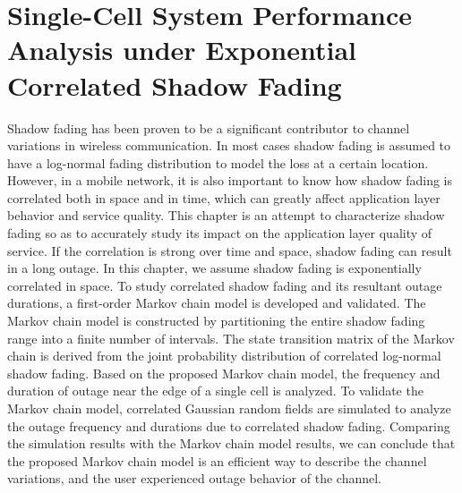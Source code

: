 \chapter{Single-Cell System Performance Analysis under Exponential Correlated Shadow Fading}\label{ch:3}
\par Shadow fading has been proven to be a significant contributor to channel variations in wireless communication. In most cases shadow fading is assumed to have a log-normal fading distribution to model the loss at a certain location. However, in a mobile network, it is also important to know how shadow fading is correlated both in space and in time, which can greatly affect application layer behavior and service quality. This chapter is an attempt to characterize shadow fading so as to accurately study its impact on the application layer quality of service. If the correlation is strong over time and space, shadow fading can result in a long outage. In this chapter, we assume shadow fading is exponentially correlated in space. To study correlated shadow fading and its resultant outage durations, a first-order Markov chain model is developed and validated. The Markov chain model is constructed by partitioning the entire shadow fading range into a finite number of intervals. The state transition matrix of the Markov chain is derived from the joint probability distribution of correlated log-normal shadow fading. Based on the proposed Markov chain model, the frequency and duration of outage near the edge of a single cell is analyzed. To validate the Markov chain model, correlated Gaussian random fields are simulated to analyze the outage frequency and durations due to correlated shadow fading. Comparing the simulation results with the Markov chain model results, we can conclude that the proposed Markov chain model is an efficient way to describe the channel variations, and the user experienced outage behavior of the channel.
